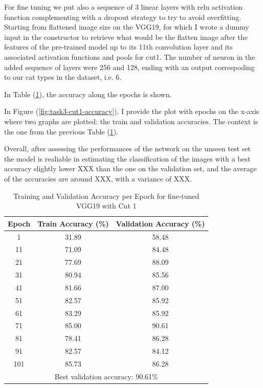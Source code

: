\documentclass[11pt]{scrartcl}
\begin{document}
For fine tuning we put also a sequence of 3 linear layers 
with relu activation function complementing 
with a dropout strategy to try to avoid overfitting.
Starting from flattened image size on the VGG19,
for which I wrote a dummy input in the constructor to retrieve what would be the
flatten image after the features of the pre-trained model up to its 11th convolution
layer and its associated activation functions and pools for cut1.
The number of neuron in the added sequence of layers were 256 and 128, 
ending with an output correspoding to our cat types in the dataset, i.e. 6.

In Table (\ref{tab:task3-cut1-accuracy}),
the accuracy along the epochs is shown.

In Figure (\ref{fig:task3-cut1-accuracy}), 
I provide the plot with epochs on the x-axis where two graphs are plotted:
the train and validation accuracies.
The context is the one from the previous Table (\ref{tab:task3-cut1-accuracy}). 

Overall, after assessing the performances of the network on the unseen test set
the model is realiable in estimating the classification of the images with
a best accuracy slightly lower XXX than the one on the validation set,
and the average of the accuracies are around XXX,
with a variance of XXX.

\begin{table}[htbp]
\centering
\caption{Training and Validation Accuracy per Epoch for fine-tuned VGG19 with Cut 1}
\begin{tabular}{ccc}
\toprule
\textbf{Epoch} & \textbf{Train Accuracy (\%)} & \textbf{Validation Accuracy (\%)} \\
\midrule
1    & 31.89 & 58.48 \\
11   & 71.09 & 84.48 \\
21   & 77.69 & 88.09 \\
31   & 80.94 & 85.56 \\
41   & 81.66 & 87.00 \\
51   & 82.57 & 85.92 \\
61   & 83.29 & 85.92 \\
71   & 85.00 & 90.61 \\
81   & 78.41 & 86.28 \\
91   & 82.57 & 84.12 \\
101  & 85.73 & 86.28 \\
\midrule
\multicolumn{3}{c}{Best validation accuracy: 90.61\%} \\
\bottomrule
\end{tabular}
\label{tab:task3-cut1-accuracy}
\end{table}
\end{document}
